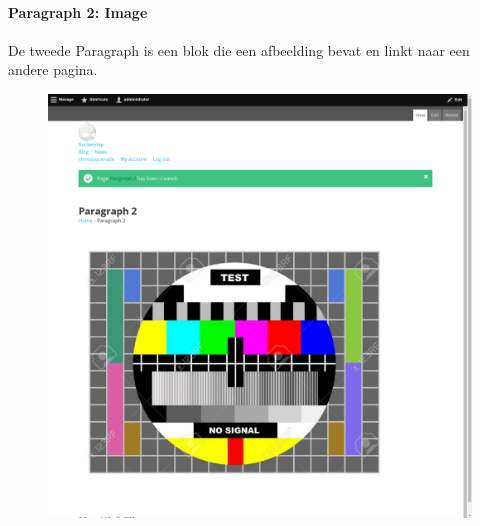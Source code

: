 \paragraph{Paragraph 2: Image}
De tweede Paragraph is een blok die een afbeelding bevat en linkt naar een andere pagina.
\begin{figure}[h]
\includegraphics[width=1\textwidth]{img/p002.png}
\end{figure}

\clearpage
